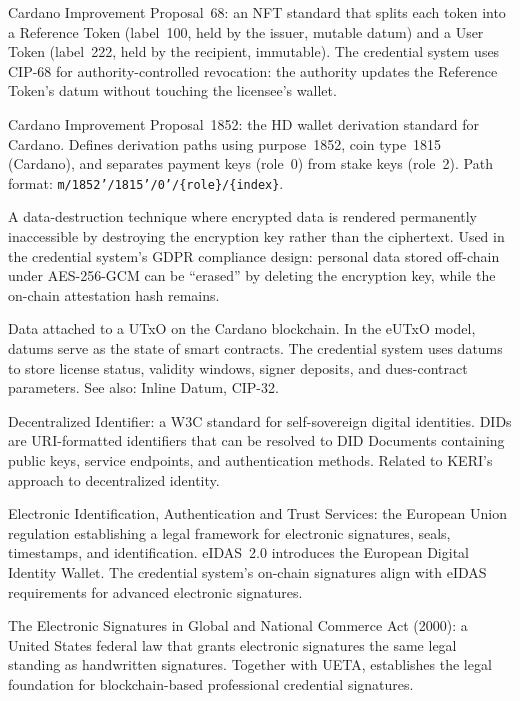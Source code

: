 \begin{description}[style=nextline, leftmargin=2.5cm, labelwidth=2.3cm]
\item[CIP-68]
  Cardano Improvement Proposal~68: an NFT standard that splits each token
  into a Reference Token (label~100, held by the issuer, mutable datum) and a
  User Token (label~222, held by the recipient, immutable).  The credential
  system uses CIP-68 for authority-controlled revocation: the authority
  updates the Reference Token's datum without touching the licensee's wallet.

\item[CIP-1852]
  Cardano Improvement Proposal~1852: the HD wallet derivation standard for
  Cardano.  Defines derivation paths using purpose~1852, coin type~1815
  (Cardano), and separates payment keys (role~0) from stake keys (role~2).
  Path format: \texttt{m/1852'/1815'/0'/\{role\}/\{index\}}.

\item[Crypto-shredding]
  A data-destruction technique where encrypted data is rendered permanently
  inaccessible by destroying the encryption key rather than the ciphertext.
  Used in the credential system's GDPR compliance design: personal data
  stored off-chain under AES-256-GCM can be ``erased'' by deleting the
  encryption key, while the on-chain attestation hash remains.

\item[Datum]
  Data attached to a UTxO on the Cardano blockchain.  In the eUTxO model,
  datums serve as the state of smart contracts.  The credential system uses
  datums to store license status, validity windows, signer deposits, and
  dues-contract parameters.  See also: Inline Datum, CIP-32.

\item[DID]
  Decentralized Identifier: a W3C standard for self-sovereign digital
  identities.  DIDs are URI-formatted identifiers that can be resolved to
  DID Documents containing public keys, service endpoints, and
  authentication methods.  Related to KERI's approach to decentralized
  identity.

\item[eIDAS]
  Electronic Identification, Authentication and Trust Services: the European
  Union regulation establishing a legal framework for electronic signatures,
  seals, timestamps, and identification.  eIDAS~2.0 introduces the European
  Digital Identity Wallet.  The credential system's on-chain signatures align
  with eIDAS requirements for advanced electronic signatures.

\item[ESIGN Act]
  The Electronic Signatures in Global and National Commerce Act (2000): a
  United States federal law that grants electronic signatures the same legal
  standing as handwritten signatures.  Together with UETA, establishes the
  legal foundation for blockchain-based professional credential signatures.


\end{description}
